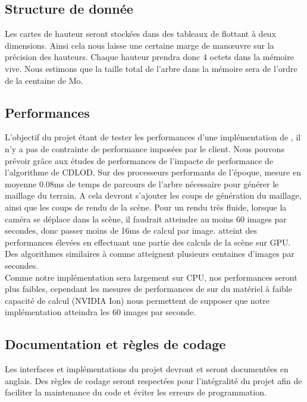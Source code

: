 \documentclass[12pt]{report}
\begin{document}
\subsection{Structure de donnée}

Les cartes de hauteur seront stockées dans des tableaux de flottant à
deux dimensions. Ainsi cela nous laisse une certaine marge de manœuvre
sur la précision des hauteurs. Chaque hauteur prendra donc 4 octets dans
la mémoire vive. Nous estimons que la taille total de l'arbre dans la
mémoire sera de l'ordre de la centaine de Mo.\\


\subsection{Performances}

L'objectif du projet étant de tester les performances d'une
implémentation de \cite{CDLOD}, il n'y a pas de contrainte de
performance imposées par le client. Nous pouvons prévoir grâce aux
études de performances de \cite{CDLOD} l'impacte de performance de
l'algorithme de CDLOD. Sur des processeurs performants de l'époque,
\cite{CDLOD} mesure en moyenne 0.08ms de temps de parcours de l'arbre
nécessaire pour générer le maillage du terrain. A cela devront s'ajouter
les coups de génération du maillage, ainsi que les coups de rendu de la
scène.  Pour un rendu très fluide, lorsque la caméra se
déplace dans la scène, il faudrait atteindre au moins 60 images par
secondes, donc passer moins de 16ms de calcul par image. \cite{CDLOD}
atteint des performances élevées en effectuant une partie des calculs de
la scène sur GPU.  Des algorithmes similaires à \cite{CDLOD} comme
\cite{PlanetRenderer} atteignent plusieurs centaines d'images par
secondes.\\
Comme notre implémentation sera largement sur CPU, nos
performances seront plus faibles, cependant les mesures de performances
de \cite{CDLOD} sur du matériel à faible capacité de calcul (NVIDIA Ion)
nous permettent de supposer que notre implémentation atteindra les 60
images par seconde.

\newpage

\subsection{Documentation et règles de codage}

Les interfaces et implémentations du projet devront et seront
documentées en anglais. Des règles de codage seront respectées pour
l'intégralité du projet afin de faciliter la maintenance du code et
éviter les erreurs de programmation.
\end{document}
